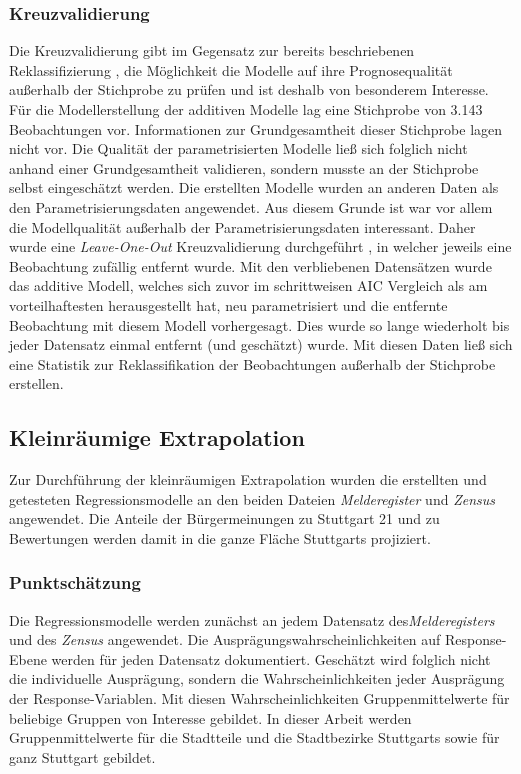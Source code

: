 \documentclass{Vorlage}
\begin{document}
\subsubsection{Kreuzvalidierung}
Die Kreuzvalidierung gibt im Gegensatz zur bereits beschriebenen Reklassifizierung , die Möglichkeit die Modelle auf ihre Prognosequalität außerhalb der Stichprobe zu prüfen und ist deshalb von besonderem Interesse.
Für die Modellerstellung der additiven Modelle lag eine Stichprobe von 3.143 Beobachtungen vor. Informationen zur Grundgesamtheit dieser Stichprobe lagen nicht vor. Die Qualität der parametrisierten Modelle ließ sich folglich nicht anhand einer Grundgesamtheit validieren, sondern musste an der Stichprobe selbst eingeschätzt werden. Die erstellten Modelle wurden an anderen Daten als den Parametrisierungsdaten angewendet. Aus diesem Grunde ist war vor allem die Modellqualität außerhalb der Parametrisierungsdaten interessant. Daher wurde eine \textit{Leave-One-Out} Kreuzvalidierung durchgeführt \cite[p. 149]{fahrmeir2013regression}, in welcher jeweils eine Beobachtung zufällig entfernt wurde. Mit den verbliebenen Datensätzen wurde das additive Modell, welches sich zuvor im schrittweisen AIC Vergleich als am vorteilhaftesten herausgestellt hat, neu parametrisiert und die entfernte Beobachtung mit diesem Modell vorhergesagt. Dies wurde so lange wiederholt bis jeder Datensatz einmal entfernt (und geschätzt) wurde. Mit diesen Daten ließ sich eine Statistik zur Reklassifikation der Beobachtungen außerhalb der Stichprobe erstellen.

\newpage
\subsection{Kleinräumige Extrapolation}
Zur Durchführung der kleinräumigen Extrapolation wurden die erstellten und getesteten Regressionsmodelle an den beiden Dateien \textit{Melderegister} und \textit{Zensus} angewendet. Die Anteile der Bürgermeinungen zu Stuttgart 21 und zu Bewertungen werden damit in die ganze Fläche Stuttgarts projiziert.

\subsubsection{Punktschätzung}
Die Regressionsmodelle werden zunächst an jedem Datensatz des\textit{Melderegisters} und des \textit{Zensus} angewendet. Die Ausprägungswahrscheinlichkeiten auf Response-Ebene werden für jeden Datensatz dokumentiert. Geschätzt wird folglich nicht die individuelle Ausprägung, sondern die Wahrscheinlichkeiten jeder Ausprägung der Response-Variablen. Mit diesen Wahrscheinlichkeiten Gruppenmittelwerte für beliebige Gruppen von Interesse gebildet. In dieser Arbeit werden Gruppenmittelwerte für die Stadtteile und die Stadtbezirke Stuttgarts sowie für ganz Stuttgart gebildet.
\end{document}

